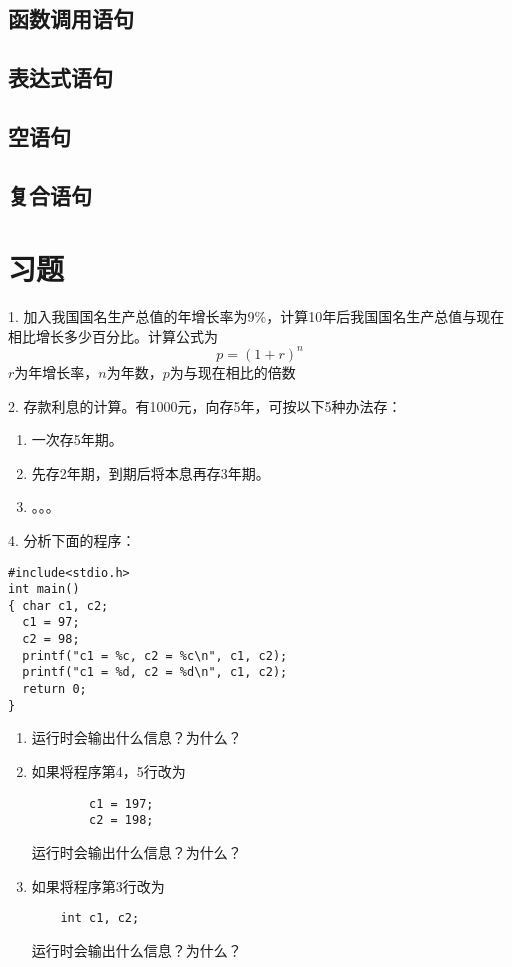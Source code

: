 \subsection{函数调用语句}
\subsection{表达式语句}
\subsection{空语句}
\subsection{复合语句}

\section{习题}

1. 加入我国国名生产总值的年增长率为9\%，计算10年后我国国名生产总值与现在相比增长多少百分比。计算公式为
\begin{equation}
p = (1 + r) ^ n
\end{equation}
$r$为年增长率，$n$为年数，$p$为与现在相比的倍数

2. 存款利息的计算。有1000元，向存5年，可按以下5种办法存：
\begin{enumerate}
	\item 一次存5年期。
	\item 先存2年期，到期后将本息再存3年期。
	\item 。。。
\end{enumerate}

4. 分析下面的程序：
\begin{lstlisting}
#include<stdio.h>
int main()
{ char c1, c2;
  c1 = 97;
  c2 = 98;
  printf("c1 = %c, c2 = %c\n", c1, c2);
  printf("c1 = %d, c2 = %d\n", c1, c2);
  return 0;
}
\end{lstlisting}
\begin{enumerate}
	\item 运行时会输出什么信息？为什么？
	\item 如果将程序第4，5行改为
		\begin{lstlisting}
		c1 = 197;
		c2 = 198;
		\end{lstlisting}
运行时会输出什么信息？为什么？
	\item 如果将程序第3行改为
	\begin{lstlisting}
	int c1, c2;
	\end{lstlisting}
运行时会输出什么信息？为什么？
\end{enumerate}

